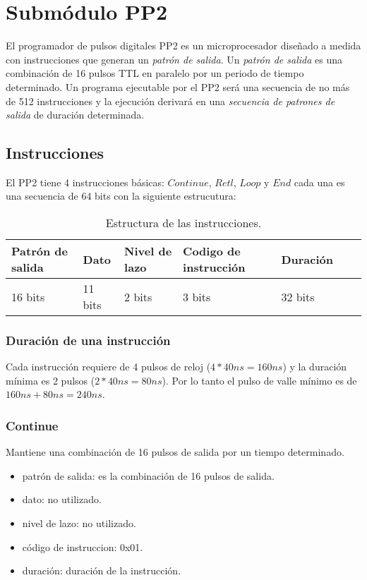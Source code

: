 \section{Subm\'odulo PP2}

El programador de pulsos digitales PP2 es un microprocesador dise\~nado a medida con instrucciones que generan
un \textit{patr\'on de salida}.
Un \textit{patr\'on de salida} es una combinaci\'on de 16 pulsos TTL en paralelo por un periodo 
de tiempo determinado.
Un programa ejecutable por el PP2 ser\'a una secuencia de no m\'as de 512 instrucciones 
y la ejecuci\'on derivar\'a en una \textit{secuencia de patrones de salida} de duraci\'on determinada.


\subsection{Instrucciones}

El PP2 tiene 4 instrucciones b\'asicas: $Continue$, $Retl$, $Loop$ y $End$ 
cada una es una secuencia de 64 bits con la siguiente estrucutura:\\
\begin{table}[ht]
    \centering
    \begin{tabular}{|l|l|l|l|l|l|l|}
    \hline
    Patr\'on de salida  & Dato & Nivel de lazo & Codigo de instrucci\'on & Duraci\'on \\
    \hline
    16 bits & 11 bits & 2 bits & 3 bits & 32 bits\\
    \hline
\end{tabular}
\caption{\label{tab:pp2_ins}Estructura de las instrucciones.}
\end{table}


\subsubsection{Duraci\'on de una instrucci\'on}
Cada instrucci\'on requiere de 4 pulsos de reloj ($4 * 40ns = 160ns$) 
y la duraci\'on m\'inima es 2 pulsos ($2 * 40ns = 80ns$). Por lo tanto el pulso de
valle m\'inimo es de $160ns + 80ns = 240ns$.

\subsubsection{Continue}
Mantiene una combinaci\'on de 16 pulsos de salida por un tiempo determinado.
\begin{itemize}
    \item patr\'on de salida: es la combinaci\'on de 16 pulsos de salida.
    \item dato: no utilizado.
    \item nivel de lazo: no utilizado.
    \item c\'odigo de instruccion: 0x01.
    \item duraci\'on: duraci\'on de la instrucci\'on.
\end{itemize}

